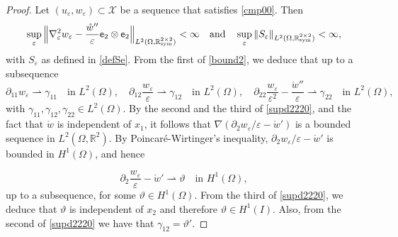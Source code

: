 \documentclass[a4, 11pt, reqno, final]{amsart}
\newcommand{\calX}{\mathcal{X}}
\newcommand{\bbR}{\mathbb{R}}
\newcommand{\n}[1]{\left\|#1\right\|}  %
\newcommand\e{\varepsilon}
\newcommand\weak{\rightharpoonup} %
\theoremstyle{plain}%
\DeclareMathOperator{\Sym}{\bbR^{2\times 2}_{\rm sym}}
\begin{document}
	\begin{proof}
		Let $(u_\e, w_{\e})\subset \calX$ be a sequence that satisfies \eqref{cmp00}.
		Then
		\begin{equation}\label{bound2}
			\sup_{\e} \Big\|\nabla^2_\e w_\e- \frac{\mathring{w} ''}{\e} \mathsf{e}_2 \otimes \mathsf{e}_2\Big\|_{L^2(\Omega,\Sym)} <\infty \quad
			\text{and}\quad\sup_{\e} \n{S_\e}_{L^2(\Omega,\Sym)} <\infty,
		\end{equation}
		with $S_\e$ as defined in \eqref{defSe}.
		From the first of \eqref{bound2}, we deduce that up to a subsequence
		\begin{equation}\label{supd2220}
			\partial_{11} w_\e \weak \gamma_{11}  \quad\text{in } L^2(\Omega), \quad \partial_{12} \frac{w_\e}{\e} \weak \gamma_{12}\quad\text{in } L^2(\Omega),\quad
			\partial_{22} \frac{w_\e}{\e^2} - \frac{\mathring{w} ''}{\e} \weak \gamma_{22}  \quad\text{in } L^2(\Omega),
		\end{equation}
		with $\gamma_{11}, \gamma_{12},\gamma_{22}\in L^2(\Omega).$
		By the second and the third of \eqref{supd2220}, and the fact that $\mathring{w}$ is independent of $x_1$, it follows that
		$\nabla (\partial_2 w_\e/\e-\mathring{w}')$ is a bounded sequence in $L^2(\Omega, \bbR^2)$.
		By Poincar\'e-Wirtinger's inequality,  $\partial_2 w_\e/\e-\mathring{w}'$ is bounded in $H^1(\Omega)$, and hence

		\begin{equation}\label{supd2220011}
			\partial_{2} \frac{w_\e}{\e} - \mathring{w} '\weak \vartheta \quad\text{in }H^1(\Omega),
		\end{equation}
		up to a subsequence, for some $\vartheta\in H^1(\Omega)$.
		From the third of \eqref{supd2220}, we deduce that $\vartheta$ is independent of $x_2$ and therefore
		$\vartheta \in H^1(I)$. Also, from the second of \eqref{supd2220} we have that $\gamma_{12}=\vartheta'$.


\end{proof}
\end{document}
